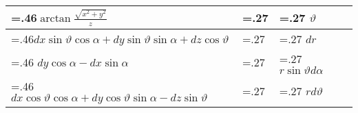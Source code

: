 \begin{tabularx}{0.45\textwidth}{>{\hsize=.46\hsize}X|>{\hsize=.27\hsize}X|>{\hsize=.27\hsize}X}
    \hline
    $\arctan \frac{\sqrt{x^{2}+y^{2}}}{z}$                                             &                 & $\vartheta$                    \\
    \hline
    $d x \sin \vartheta \cos \alpha+d y \sin \vartheta \sin \alpha+d z \cos \vartheta$ &                 & $dr$                           \\
    \hline
    $d y \cos \alpha-d x \sin \alpha$                                                  &                 & $r \sin \vartheta d \alpha$    \\
    \hline
    $d x \cos \vartheta \cos \alpha+d y \cos \vartheta \sin \alpha-d z \sin \vartheta$ &                 & $r d \vartheta$                \\
\end{tabularx}
